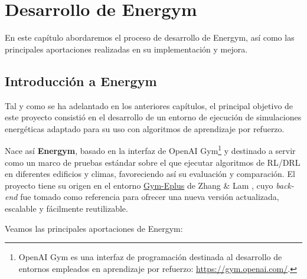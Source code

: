 \chapter{Desarrollo de Energym}
\label{ch:3}

En este capítulo abordaremos el proceso de desarrollo de Energym, así como las principales aportaciones realizadas en su implementación y mejora.

\section{Introducción a Energym}

Tal y como se ha adelantado en los anteriores capítulos, el principal objetivo de este proyecto consistió en el desarrollo de un entorno de ejecución de simulaciones energéticas adaptado para su uso con algoritmos de aprendizaje por refuerzo. 

Nace así \textbf{Energym}, basado en la interfaz de OpenAI Gym\footnote{OpenAI Gym es una interfaz de programación destinada al desarrollo de entornos empleados en aprendizaje por refuerzo: \url{https://gym.openai.com/}.} y destinado a servir como un marco de pruebas estándar sobre el que ejecutar algoritmos de RL/DRL en diferentes edificios y climas, favoreciendo así su evaluación y comparación. El proyecto tiene su origen en el entorno \href{https://github.com/zhangzhizza/Gym-Eplus}{Gym-Eplus} de Zhang \& Lam \cite{zhang2019whole, zhang2018practical}, cuyo \textit{back-end} fue tomado como referencia para ofrecer una nueva versión actualizada, escalable y fácilmente reutilizable.

Veamos las principales aportaciones de Energym:

